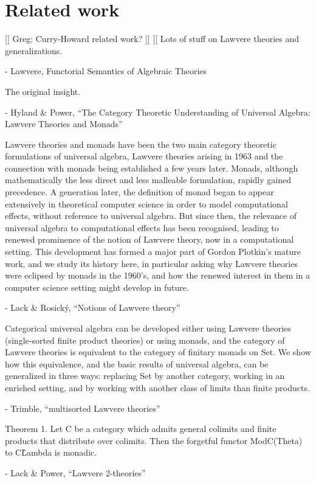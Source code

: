 \documentclass{article}
\begin{document}
\section{Related work}
[[ Greg: Curry-Howard related work? ]]
[[ Lots of stuff on Lawvere theories and generalizations.  

- Lawvere, Functorial Semantics of Algebraic Theories

The original insight.

- Hyland \& Power, ``The Category Theoretic Understanding of Universal Algebra: Lawvere Theories and Monads''

  Lawvere theories and monads have been the two main category theoretic formulations of universal algebra, Lawvere theories arising in 1963 and the connection with monads being established a few years later. Monads, although mathematically the less direct and less malleable formulation, rapidly gained precedence. A generation later, the definition of monad began to appear extensively in theoretical computer science in order to model computational effects, without reference to universal algebra. But since then, the relevance of universal algebra to computational effects has been recognised, leading to renewed prominence of the notion of Lawvere theory, now in a computational setting. This development has formed a major part of Gordon Plotkin’s mature work, and we study its history here, in particular asking why Lawvere theories were eclipsed by monads in the 1960’s, and how the renewed interest in them in a computer science setting might develop in future.

- Lack \& Rosick\'y, ``Notions of Lawvere theory''

  Categorical universal algebra can be developed either using Lawvere theories (single-sorted finite product theories) or using monads, and the category of Lawvere theories is equivalent to the category of finitary monads on Set. We show how this equivalence, and the basic results of universal algebra, can be generalized in three ways: replacing Set by another category, working in an enriched setting, and by working with another class of limits than finite products.
  
- Trimble, ``multisorted Lawvere theories''

  Theorem 1. Let C be a category which admits general colimits and finite products that distribute over colimits. Then the forgetful functor ModC(Theta) to C\^Lambda is monadic.

- Lack \& Power, ``Lawvere 2-theories''
\end{document}
